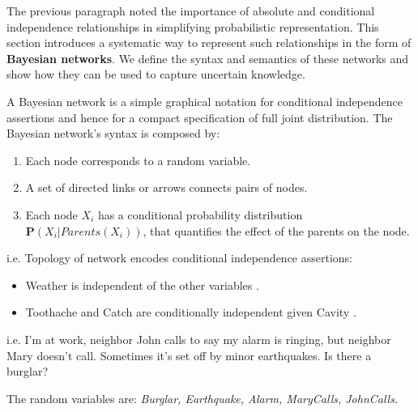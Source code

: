 The previous paragraph noted the importance of absolute and conditional independence relationships in simplifying probabilistic representation.
This section introduces a systematic way to represent such relationships in the form of \textbf{Bayesian networks}.
We define the syntax and semantics of these networks and show how they can be used to capture uncertain knowledge. \vspace{7pt}

A Bayesian network is a simple graphical notation for conditional independence assertions and hence for a compact specification of full joint distribution.
The Bayesian network's syntax is composed by:
\begin{enumerate}
    \item Each node corresponds to a random variable.
    \item A set of directed links or arrows connects pairs of nodes.
    \item Each node $X_i$ has a conditional probability distribution $\mathbf{P}(X_i|Parents(X_i))$, that quantifies the effect of the parents on the node.
\end{enumerate}
\begin{example}
    i.e. Topology of network encodes conditional independence assertions:
    \begin{center}
    \end{center}
    \begin{itemize}
        \renewcommand{\labelitemi}{-}
        \item Weather is independent of the other variables .
        \item Toothache and Catch are conditionally independent given Cavity .
    \end{itemize}
\end{example}
\begin{example}
    i.e. I'm at work, neighbor John calls to say my alarm is ringing, but neighbor Mary doesn't call. Sometimes it's set off by minor earthquakes. Is there a burglar? \vspace{3.5pt}

    The random variables are: \it Burglar, Earthquake, Alarm, MaryCalls, JohnCalls.
    \begin{center}
    \end{center}
\end{example}

